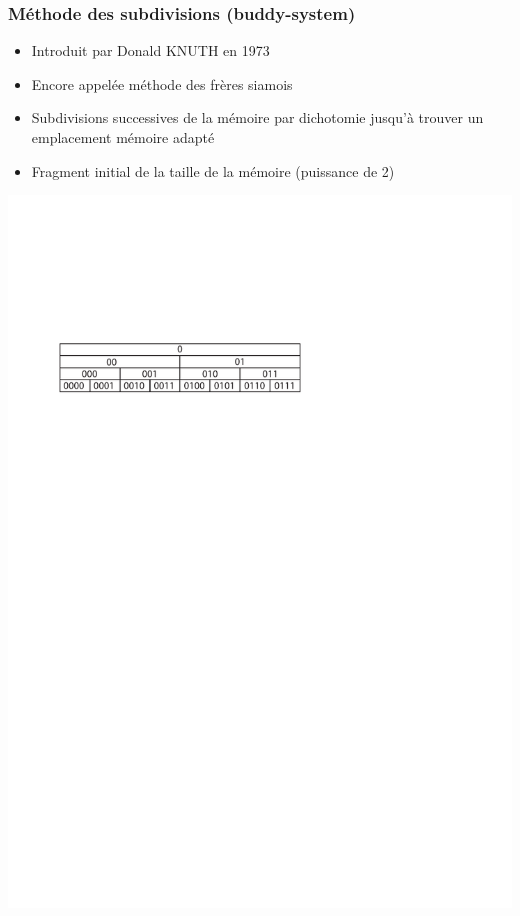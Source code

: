 \begin{frame}
\frametitle{Méthode des subdivisions (buddy-system)}
\begin{itemize}
  \item Introduit par Donald KNUTH en 1973
  \item Encore appelée méthode des frères siamois
  \item Subdivisions successives de la mémoire par dichotomie jusqu'à trouver un emplacement mémoire adapté
  \item Fragment initial de la taille de la mémoire (puissance de 2)
\end{itemize}
\includegraphics[width=\textwidth]{../illustration/buddy.pdf}
\end{frame}


